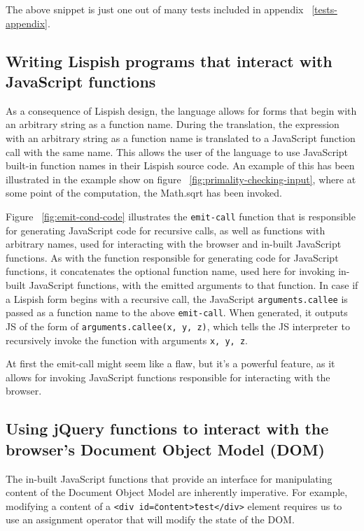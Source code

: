 The above snippet is just one out of many tests included in appendix ~\ref{tests-appendix}. 

\subsection{Writing Lispish programs that interact with JavaScript functions}
As a consequence of Lispish design, the language allows for forms that begin with an arbitrary string as a function name. During the translation, the expression with an arbitrary string as a function name is translated to a JavaScript function call with the same name. This allows the user of the language to use JavaScript built-in function names in their Lispish source code. An example of this has been illustrated in the example show on figure ~\ref{fig:primality-checking-input}, where at some point of the computation, the Math.sqrt has been invoked. 



Figure ~\ref{fig:emit-cond-code} illustrates the \texttt{emit-call} function that is responsible for generating JavaScript code for recursive calls, as well as functions with arbitrary names, used for interacting with the browser and in-built JavaScript functions. 
As with the function responsible for generating code for JavaScript functions, it concatenates the optional function name, used here for invoking in-built JavaScript functions, with the emitted arguments to that function.
In case if a Lispish form begins with a recursive call, the JavaScript \texttt{arguments.callee} is passed as a function name to the above \texttt{emit-call}.
When generated, it outputs JS of the form of \texttt{arguments.callee(x, y, z)}, which tells the JS interpreter to recursively invoke the function with arguments \texttt{x, y, z}.

At first the emit-call might seem like a flaw, but it's a powerful feature, as it allows for invoking JavaScript functions responsible for interacting with the browser. 

\subsection{Using jQuery functions to interact with the browser's Document Object Model (DOM)}
The in-built JavaScript functions that provide an interface for manipulating content of the Document Object Model are inherently imperative.
For example, modifying a content of a \texttt{<div id=\"content\">test</div>} element requires us to use an assignment operator that will modify the state of the DOM. 

